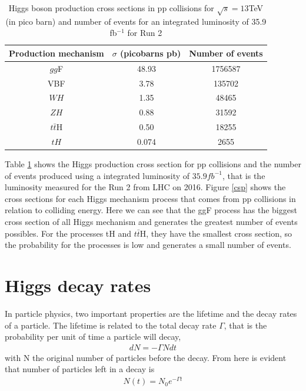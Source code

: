 \begin{table}[ht]
\centering
\caption[Higgs boson production cross sections in pp collisions number of events for  35.9 fb$^{-1}$ ]{	Higgs boson production cross sections in pp collisions for $\sqrt{s}=13$TeV (in pico barn) and number of events for an integrated luminosity of 35.9 fb$^{-1}$ for Run 2  \cite{pd}}
\begin{tabular}{|c|c|c|}
\hline
Production mechanism &
$\sigma$ (picobarns pb) & Number of events \\
\hline
$gg$F & 48.93 & 1756587\\
\hline
VBF & 3.78 & 135702\\
\hline
$WH$ & 1.35 & 48465\\
\hline
$ZH$ &0.88 & 31592\\
\hline
$t\bar{t}$H & 0.50 & 18255\\
\hline
$tH$	& 0.074 & 2655\\
\hline
\end{tabular}
\label{crt}
\end{table}

 Table \ref{crt} shows the Higgs production cross section for pp collisions and the number of events produced using a integrated luminosity of $35.9 fb^{-1}$, that is the luminosity measured for the Run 2 from LHC on 2016\cite{pd}. Figure \ref{csp} shows the cross sections for each Higgs mechanism process  that comes from pp collisions in relation to colliding energy.
Here we can see that the ggF process has the biggest cross section of all Higgs mechanism and generates the greatest number of events possibles. For the processes tH and $t\bar{t}$H, they have the smallest cross section, so the probability for the processes is low and generates a small number of events. 

\section{Higgs decay rates}
In particle physics, two important properties are the lifetime and the decay rates of a particle. The lifetime is related to the total decay rate $\Gamma$, that is the probability per unit of time a particle will decay, 
\begin{align}
  dN=-\Gamma N dt
\end{align}
with N the original number of particles before the decay. From here is evident that number of particles left in a decay is 
\begin{align}
N(t)=N_0 e^{-\Gamma t}
\end{align}


